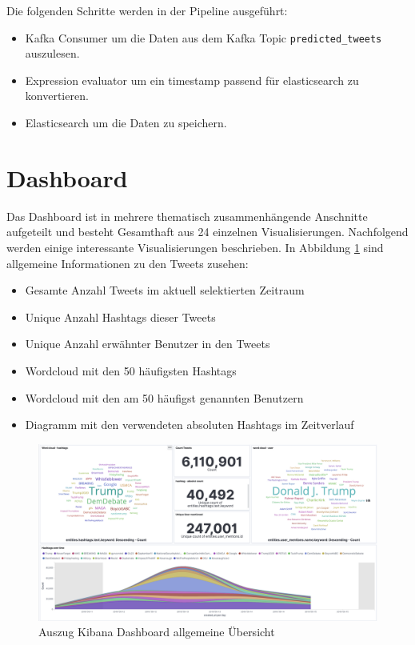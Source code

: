Die folgenden Schritte werden in der Pipeline ausgef{\"u}hrt:

\begin{itemize}
  \item Kafka Consumer um die Daten aus dem Kafka Topic \texttt{predicted\_tweets} auszulesen.
  \item Expression evaluator um ein timestamp passend f{\"u}r elasticsearch zu konvertieren.
  \item Elasticsearch um die Daten zu speichern. 
\end{itemize}

\section{Dashboard}
\label{sec:dashboard}
Das Dashboard ist in mehrere thematisch zusammenh{\"a}ngende Anschnitte aufgeteilt und besteht Gesamthaft aus 24 einzelnen Visualisierungen. Nachfolgend werden einige interessante  Visualisierungen beschrieben. In Abbildung \ref{fig:kibana_1} sind allgemeine Informationen zu den Tweets zusehen:

\begin{itemize}
  \item Gesamte Anzahl Tweets im aktuell selektierten Zeitraum
  \item Unique Anzahl Hashtags dieser Tweets
  \item Unique Anzahl erw{\"a}hnter Benutzer in den Tweets
  \item Wordcloud mit den 50 h{\"a}ufigsten Hashtags
  \item Wordcloud mit den am 50 h{\"a}ufigst genannten Benutzern
  \item Diagramm mit den verwendeten absoluten Hashtags im Zeitverlauf
\end{itemize}


\begin{figure}[H]
	\centering
		\includegraphics[scale=0.3]{images/kibana_dash_1.png}
	\caption{Auszug Kibana Dashboard allgemeine {\"U}bersicht}
	\label{fig:kibana_1}
\end{figure}

